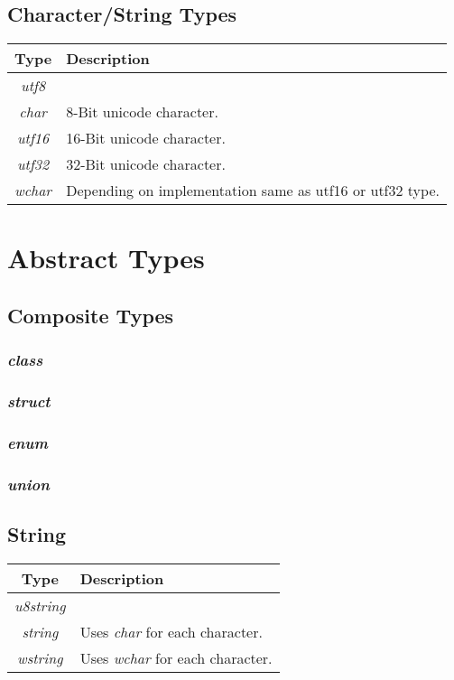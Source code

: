 \documentclass[10pt,a4paper]{article}
\begin{document}
\subsection{Character/String Types}


\begin{tabular}{c|l}
Type			& Description\\ \hline
\textit{utf8}	&  \\
\textit{char}	& 8-Bit unicode character. \\

\textit{utf16}	& 16-Bit unicode character. \\
\textit{utf32}	& 32-Bit unicode character. \\
\textit{wchar}	& Depending on implementation same as utf16 or utf32 type. \\
\end{tabular}




\section{Abstract Types}


\subsection{Composite Types}

\subsubsection{\textit{class}}
\subsubsection{\textit{struct}}
\subsubsection{\textit{enum}}
\subsubsection{\textit{union}}


\subsection{String}
\begin{tabular}{c|l}
Type				& Description\\ \hline \hline
\textit{u8string}	&  \\
\textit{string}		& Uses \textit{char} for each character. \\ \hline

\textit{wstring}	& Uses \textit{wchar} for each character. \\
\end{tabular}
\end{document}
